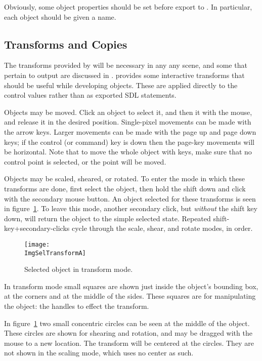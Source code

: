		Obviously, some object properties should be set
		before export to . In particular, each
		object should be given a name.

		\subsection{\dtypkgu{} Transforms and Copies}%
		\label{ssec:epspline_transforms}
		The transforms provided by \IXpov{} 
		will be necessary in any any scene, and some
		that pertain to \IXpkg{} output are
		discussed in .
		\IXpkgu{} provides some interactive transforms
		that should be useful while developing objects.
		These are applied directly to the control 
		values rather than as exported SDL statements.
		
		Objects may be moved. Click an object to select it,
		and then  it with the mouse, and
		release it in the desired position. Single-pixel
		movements can be made with the arrow keys. Larger
		movements can be made with the page up and page down
		keys; if the control (or command) key is down then
		the page-key movements will be horizontal. Note that
		to move the whole object with keys, make sure that
		no control point is selected, or the point will be
		moved.
		
		Objects may be scaled, sheared, or rotated.
		To enter the mode in which these transforms are
		done, first select the object, then hold the
		shift  down and click with the secondary
		mouse button. An object selected for these
		transforms is seen in figure~\ref{fig:sel_for_trans_a}.
		To leave this mode, another secondary click, but
		\emph{without} the shift key down, will return
		the object to the simple selected state.
		Repeated shift-key+secondary-clicks
		cycle through the scale, shear, and rotate modes,
		in order.

		\begin{figure}[htb!]
		\centering
		\texttt{[image: \\ImgSelTransformA]}
		\caption{Selected object in transform mode.}
		\label{fig:sel_for_trans_a}
		\end{figure}
		
		In transform mode small squares are
		shown just inside the object's bounding box, at the
		corners and at the middle of the sides. These
		squares are  for manipulating
		the object:  the handles to effect the
		transform.
		
		In figure~\ref{fig:sel_for_trans_a}
		two small concentric circles can be seen at the
		middle of the object. These circles are shown for
		shearing and rotation, and may be dragged with the
		mouse to a new location.
		The transform will be centered at the circles.
		They are not shown in the scaling mode, which uses no
		center as such.
		
